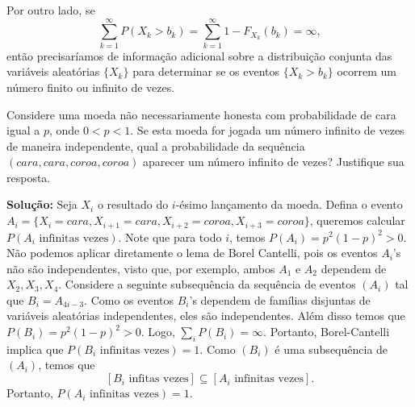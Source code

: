 \begin{frame}
Por outro lado, se
$$\sum_{k=1}^{\infty}P(X_k>b_k)=\sum_{k=1}^{\infty}1-F_{X_k}(b_k)=\infty,$$
então precisaríamos de informação adicional sobre a distribuição conjunta das variáveis aleatórias $\{X_k\}$ para determinar se os eventos $\{X_k>b_k\}$ ocorrem um número finito ou infinito de vezes.
\end{frame}
%
%
\begin{frame}
%
%
\begin{exem}
Considere uma moeda não necessariamente honesta com probabilidade de cara igual a $p$, onde $0<p<1$.
Se esta moeda for jogada um número infinito de vezes de maneira independente, qual a probabilidade da sequência $(cara,cara,coroa,coroa)$ aparecer um número infinito de vezes? Justifique sua resposta.
%
%
%

{\bf Solução:} Seja $X_i$ o resultado do $i$-ésimo lançamento da moeda. Defina o evento $A_i=\{X_i=cara,X_{i+1}=cara,X_{i+2}=coroa,X_{i+3}=coroa\}$, queremos calcular $P(A_i\mbox{ infinitas vezes})$. Note que para todo $i$, temos $P(A_i)=p^2(1-p)^2>0$. Não podemos aplicar diretamente o lema de Borel Cantelli, pois os eventos $A_i$'s não são independentes, visto que, por exemplo, ambos $A_1$ e $A_2$ dependem de $X_2,X_3,X_4$. Considere a seguinte subsequência da sequência de eventos $(A_i)$ tal que $B_i=A_{4i-3}$. Como os eventos $B_i$'s dependem de famílias disjuntas de variáveis aleatórias independentes, eles são independentes. Além disso temos que $P(B_i)=p^2(1-p)^2>0$. Logo, $\sum_iP(B_i)=\infty$. Portanto, Borel-Cantelli implica que $P(B_i\mbox{ infinitas vezes})=1$. Como $(B_i)$ é uma subsequência de $(A_i)$, temos que
$$[B_i\mbox{ infitas vezes}]\subseteq [A_i\mbox{ infinitas vezes}].$$
Portanto, $P(A_i\mbox{ infinitas vezes})=1$.
\end{exem}
%
\end{frame}
%
